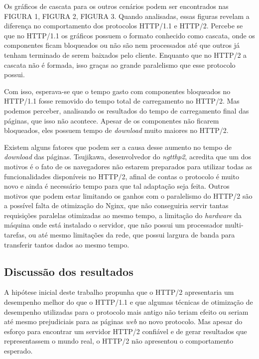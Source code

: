 Os gráficos de cascata para os outros cenários podem ser encontrados nas FIGURA 1, FIGURA 2, FIGURA 3. Quando analisadas, essas figuras revelam a diferença no comportamento dos protocolos HTTP/1.1 e HTTP/2. Percebe se que no HTTP/1.1 os gráficos possuem o formato conhecido como cascata, onde os componentes ficam bloqueados ou não são nem processados até que outros já tenham terminado de serem baixados pelo cliente. Enquanto que no HTTP/2 a cascata não é formada, isso graças ao grande paralelismo que esse protocolo possui.

Com isso, esperava-se que o tempo gasto com componentes bloqueados no HTTP/1.1 fosse removido do tempo total de carregamento no HTTP/2. Mas podemos perceber, analisando os resultados do tempo de carregamento final das páginas, que isso não acontece. Apesar de os componentes não ficarem bloqueados, eles possuem tempo de \textit{download} muito maiores no HTTP/2.

Existem alguns fatores que podem ser a causa desse aumento no tempo de \textit{download} das páginas. Tsujikawa, desenvolvedor do \textit{ngtthp2}, acredita que um dos motivos é o fato de os navegadores não estarem preparados para utilizar todas as funcionalidades disponíveis no HTTP/2, afinal de contas o protocolo é muito novo e ainda é necessário tempo para que tal adaptação seja feita. Outros motivos que podem estar limitando os ganhos com o paralelismo do HTTP/2 são a possível falta de otimização do Nginx, que não conseguiria servir tantas requisições paralelas otimizadas ao mesmo tempo, a limitação do \textit{hardware} da máquina onde está instalado o servidor, que não possui um processador multi-tarefas, ou até mesmo limitações da rede, que possui largura de banda para transferir tantos dados ao mesmo tempo.

\subsection{Discussão dos resultados}
\label{discussaodosresultados}

A hipótese inicial deste trabalho propunha que o HTTP/2 apresentaria um desempenho melhor do que o HTTP/1.1 e que algumas técnicas de otimização de desempenho utilizadas para o protocolo mais antigo não teriam efeito ou seriam até mesmo prejudiciais para as páginas \textit{web} no novo protocolo. Mas apesar do esforço para encontrar um servidor HTTP/2 confiável e de gerar resultados que representassem o mundo real, o HTTP/2 não apresentou o comportamento esperado.

